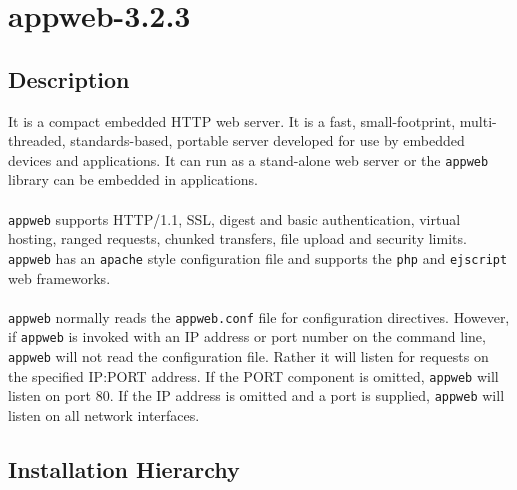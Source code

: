 \documentclass[a4paper]{report}
\begin{document}
\chapter{appweb-3.2.3}
\section{Description}
It is a compact embedded HTTP web server. It is a fast, small-footprint, multi-threaded, 
standards-based, portable server developed for use by embedded devices  
and applications.  It can run as a stand-alone web server or the {\tt appweb} 
library can be embedded in applications.\\\\
{\tt appweb} supports HTTP/1.1, SSL, digest and basic authentication, virtual hosting, 
ranged requests, chunked transfers, file upload and security limits.  {\tt appweb} has an 
{\tt apache} style configuration file and supports the {\tt php} and {\tt ejscript} 
web frameworks.\\\\
{\tt appweb} normally reads the {\tt appweb.conf} file for configuration directives. 
However, if {\tt appweb} is invoked with an IP address or port number on the command line, 
{\tt appweb} will not read the configuration file. Rather it will listen  for  requests  
on  the  specified IP:PORT address. If the PORT component is omitted, {\tt appweb} will 
listen on port 80. If the IP address is omitted and a port is supplied, {\tt appweb} 
will listen on all network interfaces.
\section{Installation Hierarchy}
\begin{lstlisting}

\end{lstlisting}
\end{document}
